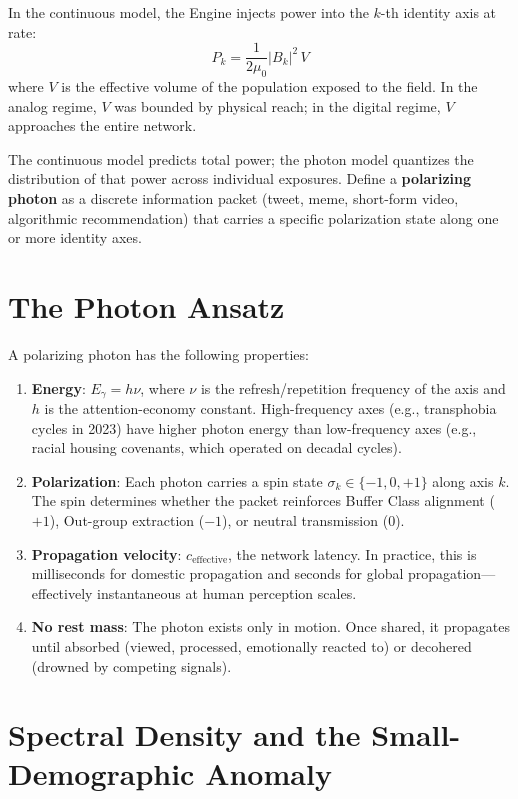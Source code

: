In the continuous model, the Engine injects power into the $k$-th identity axis at rate:
\begin{equation}\label{eq:app-photon-field-power}
P_k = \frac{1}{2\mu_0} |B_k|^2 \, V
\end{equation}
where $V$ is the effective volume of the population exposed to the field. In the analog regime, $V$ was bounded by physical reach; in the digital regime, $V$ approaches the entire network.

The continuous model predicts total power; the photon model quantizes the distribution of that power across individual exposures. Define a \textbf{polarizing photon} as a discrete information packet (tweet, meme, short-form video, algorithmic recommendation) that carries a specific polarization state along one or more identity axes.

\section{The Photon Ansatz}

A polarizing photon has the following properties:

\begin{enumerate}
    \item \textbf{Energy}: $E_{\gamma} = h \nu$, where $\nu$ is the refresh/repetition frequency of the axis and $h$ is the attention-economy constant. High-frequency axes (e.g., transphobia cycles in 2023) have higher photon energy than low-frequency axes (e.g., racial housing covenants, which operated on decadal cycles).
    \item \textbf{Polarization}: Each photon carries a spin state $\sigma_k \in \{-1, 0, +1\}$ along axis $k$. The spin determines whether the packet reinforces Buffer Class alignment ($+1$), Out-group extraction ($-1$), or neutral transmission ($0$).
    \item \textbf{Propagation velocity}: $c_{\text{effective}}$, the network latency. In practice, this is milliseconds for domestic propagation and seconds for global propagation---effectively instantaneous at human perception scales.
    \item \textbf{No rest mass}: The photon exists only in motion. Once shared, it propagates until absorbed (viewed, processed, emotionally reacted to) or decohered (drowned by competing signals).
\end{enumerate}

\section{Spectral Density and the Small-Demographic Anomaly}


